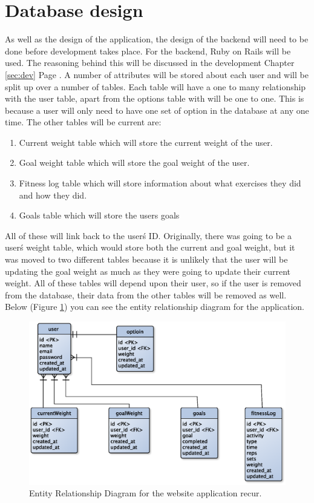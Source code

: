 \section{Database design}
As well as the design of the application, the design of the backend will need to be done before development takes place. For the backend, Ruby on Rails \citep{rails:2013} will be used. The reasoning behind this will be discussed in the development Chapter \ref{sec:dev} Page \pageref{sec:dev}. A number of attributes will be stored about each user and will be split up over a number of tables. Each table will have a one to many relationship with the user table, apart from the options table with will be one to one. This is because a user will only need to have one set of option in the database at any one time. The other tables will be current are:

\begin{enumerate}
\item Current weight table which will store the current weight of the user.
\item Goal weight table which will store the goal weight of the user.
\item Fitness log table which will store information about what exercises they did and how they did.
\item Goals table which will store the users goals
\end{enumerate}

\noindent
All of these will link back to the user\'s ID. Originally, there was going to be a user\'s weight table, which would store both the current and goal weight, but it was moved to two different tables because it is unlikely that the user will be updating the goal weight as much as they were going to update their current weight. All of these tables will depend upon their user, so if the user is removed from the database, their data from the other tables will be removed as well. Below (Figure \ref{fig:erd}) you can see the entity relationship diagram for the application.

\begin{figure}[!ht]
\centering
\includegraphics[scale=0.5]{chapters/figs/erd}
\caption{Entity Relationship Diagram for the website application recur.}
\label{fig:erd}
\end{figure}